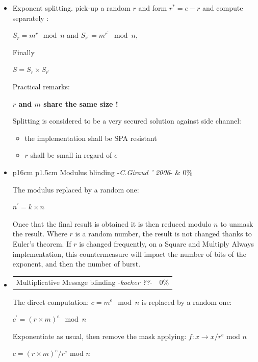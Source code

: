 \begin{itemize}
\item Exponent splitting.
pick-up a random $r$ and form $r^{\ast}=e-r$ and compute separately :
		\begin{center}
			$ S_{r} = m^{r} \mod n$ and $ S_{r^{'}} = m^{r^{'}} \mod n$,
		\end{center}
		Finally
		\begin{center}
			$S = S_{r} \times  S_{r^{'}} $
		\end{center}
		Practical remarks: 
		\begin{center}
			\textbf{$r$ and $m$ share the same size !}
		\end{center}
Splitting is considered to be a very secured solution against side channel:
\begin{itemize}
\item the implementation shall be SPA resistant
\item $r$ shall be small in regard of $e$
\end{itemize}		

\item	\begin{tabularx}{\linewidth}{ p{16cm} p{1.5cm}}
		Modulus blinding -\textit{C.Giraud ' 2006}-  & $0\%$ \\ 
		\end{tabularx}	
		\noindent 
		The modulus replaced by a random one:
		\begin{center}
			$n^{'} =  k \times n$
		\end{center}
		Once that the final result is obtained it is then reduced modulo $n$ 
		to unmask the result. Where $r$ is a random number, the result is not changed 
		thanks to Euler's theorem. If $r$ is changed frequently, on a Square and Multiply 
		Always implementation, this countermeasure will impact the number of bits of the 
		exponent, and then the number of burst.

\item	\begin{tabularx}{\linewidth}{ p{16cm} p{1.5cm}}
			Multiplicative Message blinding -\textit{kocher ??}-  & $0\%$ \\ 
			\end{tabularx}	
			\noindent 
The direct computation: $c = m^e \mod n$ is replaced by a random one:
\begin{center}
$c^{'} = (r \times m)^{ e } \mod n$\\
\end{center}
Exponentiate as usual, then remove the mask applying: $ f:x \rightarrow x/r^e$ mod $n$
	\begin{center}
		$c = {( r \times m )}^e / r^e$ mod $n$
	\end{center}


\end{itemize}
